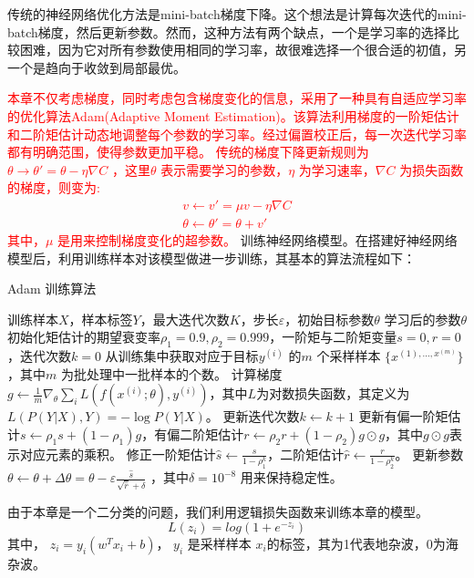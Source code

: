 传统的神经网络优化方法是mini-batch梯度下降。这个想法是计算每次迭代的mini-batch梯度，然后更新参数。然而，这种方法有两个缺点，一个是学习率的选择比较困难，因为它对所有参数使用相同的学习率，故很难选择一个很合适的初值，另一个是趋向于收敛到局部最优。

\textcolor{red}{
本章不仅考虑梯度，同时考虑包含梯度变化的信息，采用了一种具有自适应学习率的优化算法Adam(Adaptive Moment Estimation)。该算法利用梯度的一阶矩估计和二阶矩估计动态地调整每个参数的学习率。经过偏置校正后，每一次迭代学习率都有明确范围，使得参数更加平稳。
传统的梯度下降更新规则为$\theta \rightarrow \theta'=\theta-\eta\nabla C$ ，这里$\theta$ 表示需要学习的参数，$\eta$ 为学习速率，$\nabla C$ 为损失函数的梯度，则变为:
\begin{align}
	v\leftarrow v'=\mu v - \eta \nabla C \\
	\theta \leftarrow \theta' = \theta +v'
\end{align}
其中，$\mu$ 是用来控制梯度变化的超参数。
}
训练神经网络模型。在搭建好神经网络模型后，利用训练样本对该模型做进一步训练，其基本的算法流程如下：

\begin{algorithm}[H]
	\caption{Adam 训练算法}
	\begin{algorithmic}[1] %
		\Require 训练样本$X$，样本标签$Y$，最大迭代次数$K$，步长$\varepsilon$，初始目标参数$\theta$
		\Ensure 学习后的参数$\theta$
		\State 初始化矩估计的期望衰变率$\rho_1=0.9,\rho_2=0.999$，一阶矩与二阶矩变量$s=0,r=0$，迭代次数$k=0$
			\State 从训练集中获取对应于目标$y^{(i)}$ 的$m$ 个采样样本 $\{x^{(1),\dots,x^{(m)}}\}$ ，其中$m$ 为批处理中一批样本的个数。
			\label{line:start}
			\State 计算梯度$g \leftarrow \frac{1}{m} \nabla_{\theta} \sum_i L(f(x^{(i)};\theta), y^{(i)}) $，其中$L$为对数损失函数，其定义为$L(P(Y|X),Y) = - \log P(Y|X) $。
			\State 更新迭代次数$k \leftarrow k+1 $
			\State 更新有偏一阶矩估计$s \leftarrow \rho_1 s + (1 - \rho_1) g $，有偏二阶矩估计$r \leftarrow \rho_2 r + (1-\rho_2) g \odot g $，其中$ g \odot g $表示对应元素的乘积。
			\State 修正一阶矩估计$\hat{s} \leftarrow \frac{s}{1-\rho^k_1} $，二阶矩估计$\hat{r} \leftarrow \frac{r}{1-\rho^k_2} $。
			\State 更新参数 $\theta \leftarrow \theta + \Delta \theta = \theta - \varepsilon \frac{\hat{s}}{\sqrt{\hat{r}} + \delta} $
			，其中$\delta = 10^{-8} $
			用来保持稳定性。
		\EndWhile
	\end{algorithmic}
\end{algorithm}

由于本章是一个二分类的问题，我们利用逻辑损失函数来训练本章的模型。
\begin{equation}
	L(z_i) = log(1+e^{-z_i})
\end{equation}
其中， $z_i=y_i(w^T x_i + b)$， $y_i$ 是采样样本 $x_i$的标签，其为1代表地杂波，0为海杂波。

